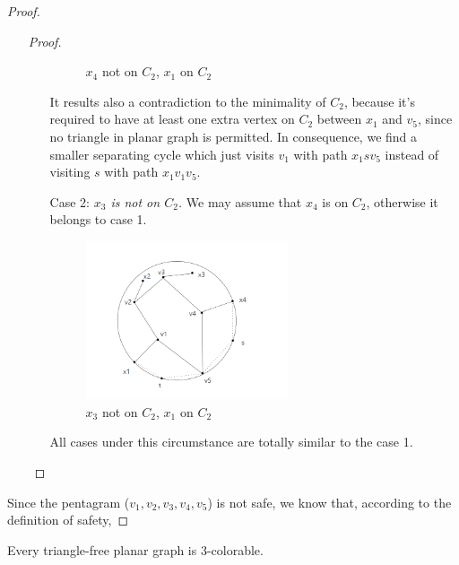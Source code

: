 \begin{proof}
\begin{itemize}
\begin{proof}
\begin{itemize}
\begin{figure}[H]
    \caption{$x_4$ not on $C_2$, $x_1$ on $C_2$} %
    \label{figure} %
    \end{figure}
    It results also a contradiction to the minimality of $C_2$, because it's required to have at least one extra vertex on $C_2$ between $x_1$ and $v_5$, since no triangle in planar graph is permitted. In consequence, we find a smaller separating cycle which just visits $v_1$ with path $x_1sv_5$ instead of visiting $s$ with path $x_1v_1v_5$.
    \item[Case 2:] \textit{\textit{$x_3$ is not on $C_2$.}} We may assume that $x_4$ is on $C_2$, otherwise it belongs to case 1. 
    \begin{figure}[H] %
    \centering %
    \includegraphics[width=0.6\textwidth]{figure/x3notonc2.png} 
    \caption{$x_3$ not on $C_2$, $x_1$ on $C_2$} %
    \label{figure} %
    \end{figure}
    All cases under this circumstance are totally similar to the case 1.
\end{itemize}
\end{proof}

\end{itemize}
Since the pentagram ($v_1, v_2, v_3, v_4, v_5$) is not safe, we know that, according to the definition of safety, 
\end{proof}
\begin{theorem}
Every triangle-free planar graph is 3-colorable.
\end{theorem}
